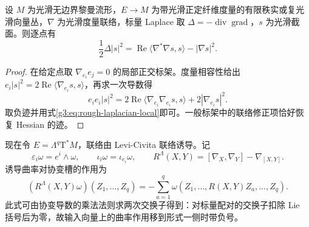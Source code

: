 \begin{lemma}\label{g3:lem:connection-norm-laplacian}
	设 \(M\) 为光滑无边界黎曼流形，\(E\to M\) 为带光滑正定纤维度量的有限秩实或复光滑向量丛，\(\nabla\) 为光滑度量联络，标量 Laplace 取 \(\Delta=-\operatorname{div}\operatorname{grad}\)，\(s\) 为光滑截面。则逐点有
	\[
		\frac12\Delta|s|^2
		=\operatorname{Re}\langle\nabla^*\nabla s,s\rangle-|\nabla s|^2.
	\]
\end{lemma}
\begin{proof}
	在给定点取 \(\nabla_{e_i}e_j=0\) 的局部正交标架。度量相容性给出
	\(e_i|s|^2=2\operatorname{Re}\langle\nabla_{e_i}s,s\rangle\)，再求一次导数得
	\[
		e_i e_i|s|^2
		=2\operatorname{Re}\langle\nabla_{e_i}\nabla_{e_i}s,s\rangle
		 +2|\nabla_{e_i}s|^2.
	\]
	取负迹并用式\eqref{g3:eq:rough-laplacian-local}即可。一般标架中的联络修正项恰好恢复 Hessian 的迹。
\end{proof}

现在令 \(E=\Lambda^q\mathrm T^*M\)，联络由 Levi-Civita 联络诱导。记
\[
	\varepsilon_i\omega=e^i\wedge\omega,\qquad
	\iota_i\omega=\iota_{e_i}\omega,\qquad
	R^\Lambda(X,Y)=[\nabla_X,\nabla_Y]-\nabla_{[X,Y]}.
\]
诱导曲率对协变槽的作用为
\begin{equation}\label{g3:eq:curvature-action-on-forms}
	(R^\Lambda(X,Y)\omega)(Z_1,\ldots,Z_q)
	=-\sum_{a=1}^q
	\omega(Z_1,\ldots,R(X,Y)Z_a,\ldots,Z_q).
\end{equation}
此式可由协变导数的乘法法则求两次交换子得到：对标量配对的交换子扣除 Lie 括号后为零，故输入向量上的曲率作用移到形式一侧时带负号。

